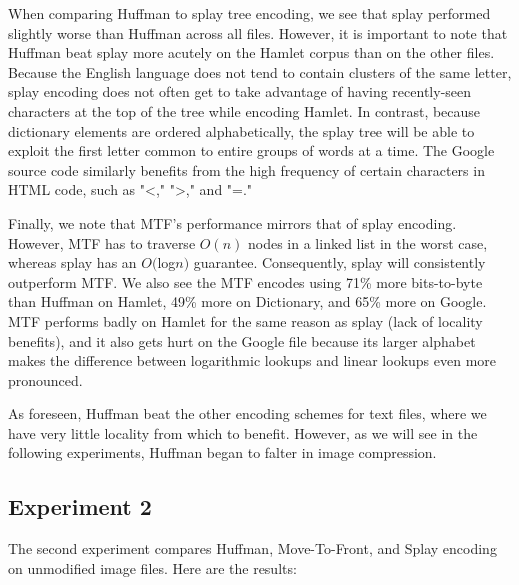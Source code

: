 \documentclass[twoside]{article}
\begin{document}
\begin{multicols}{2}
When comparing Huffman to splay tree encoding, we see that splay performed slightly worse than Huffman across all files. However, it is important to note that Huffman beat splay more acutely on the Hamlet corpus than on the other files. Because the English language does not tend to contain clusters of the same letter, splay encoding does not often get to take advantage of having recently-seen characters at the top of the tree while encoding Hamlet. In contrast, because dictionary elements are ordered alphabetically, the splay tree will be able to exploit the first letter common to entire groups of words at a time. The Google source code similarly benefits from the high frequency of certain characters in HTML code, such as "<," ">," and "=."

Finally, we note that MTF's performance mirrors that of splay encoding. However, MTF has to traverse $O(n)$ nodes in a linked list in the worst case, whereas splay has an $O($log$ n)$ guarantee. Consequently, splay will consistently outperform MTF. We also see the MTF encodes using 71\% more bits-to-byte than Huffman on Hamlet, 49\% more on Dictionary, and 65\% more on Google. MTF performs badly on Hamlet for the same reason as splay (lack of locality benefits), and it also gets hurt on the Google file because its larger alphabet makes the difference between logarithmic lookups and linear lookups even more pronounced.

As foreseen, Huffman beat the other encoding schemes for text files, where we have very little locality from which to benefit. However, as we will see in the following experiments, Huffman began to falter in image compression.

\subsection*{Experiment 2}
The second experiment compares Huffman, Move-To-Front, and Splay encoding on unmodified image files. 
Here are the results: 


\end{multicols}
\end{document}
